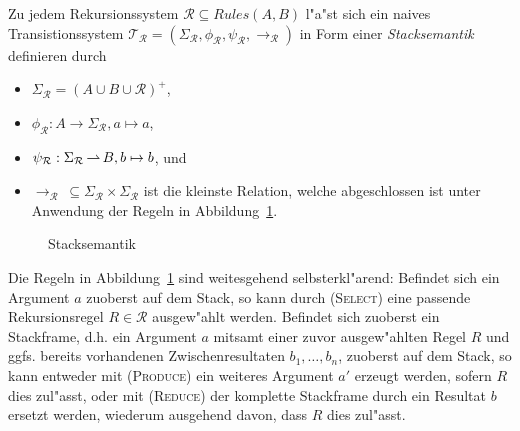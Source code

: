 \documentclass[12pt,a4paper,final]{article}
\begin{document}
Zu jedem Rekursionssystem \mbox{$\mathcal{R} \subseteq \mathit{Rules}(A,B)$} l"a"st sich ein naives Transistionssystem
\mbox{$\mathcal{T}_{\mathcal{R}} = (\Sigma_{\mathcal{R}},\phi_{\mathcal{R}},\psi_{\mathcal{R}},\rightarrow_{\mathcal{R}} )$}
in Form einer \emph{Stacksemantik} definieren durch
\begin{itemize}
\item $\Sigma_{\mathcal{R}} = (A \cup B \cup \mathcal{R})^+$,
\item $\phi_{\mathcal{R}}: A \to \Sigma_{\mathcal{R}}, a \mapsto a$,
\item $\psi_{\mathcal{R}}: \Sigma_{\mathcal{R}} \operatorname{\rightharpoonup} B, b \mapsto b$, und
\item $\rightarrow_{\mathcal{R}}\ \subseteq \Sigma_{\mathcal{R}} \times \Sigma_{\mathcal{R}}$ ist die kleinste
  Relation, welche abgeschlossen ist unter Anwendung der Regeln in Abbildung~\ref{fig:Stacksemantik}.
\end{itemize}
\begin{figure}[htb]
  \centering
  \caption{Stacksemantik}
  \label{fig:Stacksemantik}
\end{figure}
Die Regeln in Abbildung~\ref{fig:Stacksemantik} sind weitesgehend selbsterkl"arend: Befindet
sich ein Argument $a$ zuoberst auf dem Stack, so kann durch \textsc{(Select)} eine
passende Rekursionsregel \mbox{$R \in \mathcal{R}$} ausgew"ahlt werden. Befindet sich zuoberst
ein Stackframe, d.h. ein Argument $a$ mitsamt einer zuvor ausgew"ahlten Regel $R$ und ggfs.\xspace
bereits vorhandenen Zwischenresultaten \mbox{$b_1,\ldots,b_n$}, zuoberst auf dem Stack, so
kann entweder mit \textsc{(Produce)} ein weiteres Argument $a'$ erzeugt werden, sofern $R$ dies
zul"asst, oder mit \textsc{(Reduce)} der komplette Stackframe durch ein Resultat $b$ ersetzt
werden, wiederum ausgehend davon, dass $R$ dies zul"asst.
\end{document}
